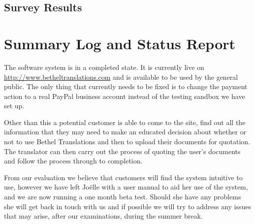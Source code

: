 \documentclass{l3proj}
\begin{document}
\section{Survey Results}
\label{sect:survey-results}

\chapter{Summary Log and Status Report}
The software system is in a completed state. It is currently live on \url{http://www.betheltranslations.com} and is available to be used
by the general public. The only thing that currently needs to be fixed is to change the payment action to a real PayPal business account instead of
the testing sandbox we have set up.

Other than this a potential customer is able to come to the site, find out all the information that they may need to make an educated decision
about whether or not to use Bethel Translations and then to upload their documents for quotation. The translator can then carry out the process
of quoting the user's documents and follow the process through to completion.

From our evaluation we believe that customers will find the system intuitive to use, however we have left Jo\"{e}lle with a user manual to aid
her use of the system, and we are now running a one month beta test. Should she have any problems she will get back in touch with us and if possible
we will try to address any issues that may arise, after our examinations, during the summer break.
 
    
\end{document}
